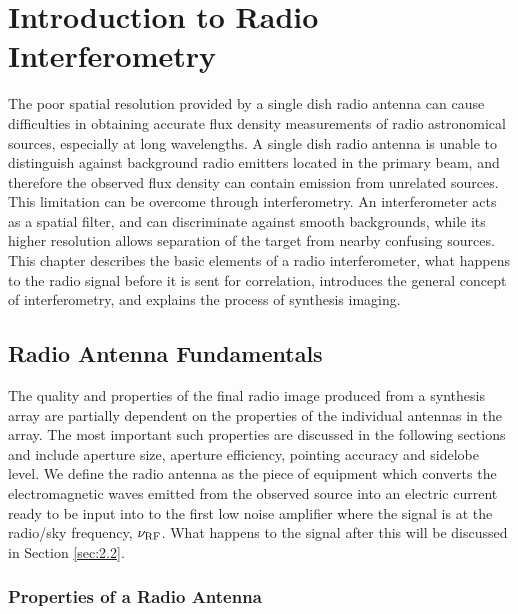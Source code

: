 

\chapter{Introduction to Radio Interferometry} \label{chap:2}

The poor spatial resolution provided by a single dish radio antenna can cause difficulties in obtaining accurate flux density measurements of radio astronomical sources, especially at long wavelengths. A single dish radio antenna is unable to distinguish against background radio emitters located in the primary beam, and therefore the observed flux density can contain emission from unrelated sources. This limitation can be overcome through interferometry. An interferometer acts as a spatial filter, and can discriminate against smooth backgrounds, while its higher resolution allows separation of the target from nearby confusing sources. This chapter describes the basic elements of a radio interferometer, what happens to the radio signal before it is sent for correlation, introduces the general concept of interferometry, and  explains the process of synthesis imaging.

\section{Radio Antenna Fundamentals}\label{sec:2.1}

The quality and properties of the final radio image produced from a synthesis array are partially dependent on the properties of the individual antennas in the array. The most important such properties are discussed in the following sections and include aperture size, aperture efficiency, pointing accuracy and sidelobe level. We define the radio antenna as the piece of equipment which converts the electromagnetic waves emitted from the observed source into an electric current ready to be input into to the first low noise amplifier where the signal is at the radio/sky frequency, $\nu _{\rm{RF}}$. What happens to the signal after this will be discussed in Section \ref{sec:2.2}.

\subsection{Properties of a Radio Antenna}\label{subsec:2.1.1}

